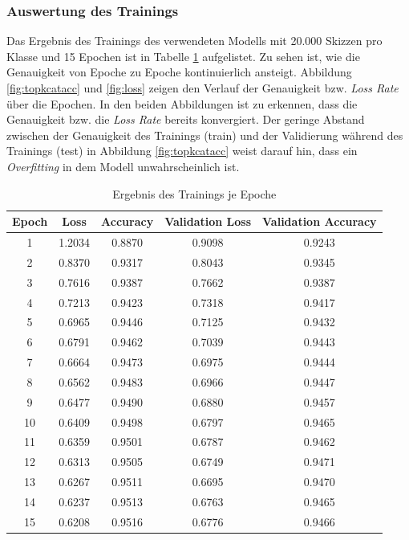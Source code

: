 \documentclass[11pt]{article}
\begin{document}
\subsubsection{Auswertung des Trainings}
Das Ergebnis des Trainings des verwendeten Modells mit 20.000 Skizzen pro Klasse und 15 Epochen ist in Tabelle \ref{tab:ErgebnisTraining} aufgelistet. Zu sehen ist, wie die Genauigkeit von Epoche zu Epoche kontinuierlich ansteigt.
Abbildung \ref{fig:topkcatacc} und \ref{fig:loss} zeigen den Verlauf der Genauigkeit bzw. \textit{Loss Rate} über die Epochen. In den beiden Abbildungen ist zu erkennen, dass die Genauigkeit bzw. die \textit{Loss Rate} bereits konvergiert. Der geringe Abstand zwischen der Genauigkeit des Trainings (train) und der Validierung während des Trainings (test) in Abbildung \ref{fig:topkcatacc} weist darauf hin, dass ein \textit{Overfitting} in dem Modell unwahrscheinlich ist. 


\begin{table}
	\centering
	\caption{\label{tab:ErgebnisTraining} Ergebnis des Trainings je Epoche}	
	\begin{tabular}{ccccc}
		\hline
		Epoch & Loss & Accuracy & Validation Loss & Validation Accuracy \\ 
		\hline
		1 & 1.2034  & 0.8870 & 0.9098 & 0.9243 \\
		2 & 0.8370  & 0.9317 & 0.8043 & 0.9345 \\
		3 & 0.7616  & 0.9387 & 0.7662 & 0.9387 \\
		4 & 0.7213  & 0.9423 & 0.7318 & 0.9417 \\
		5 & 0.6965  & 0.9446 & 0.7125 & 0.9432 \\
		6 & 0.6791  & 0.9462 & 0.7039 & 0.9443 \\
		7 & 0.6664  & 0.9473 & 0.6975 & 0.9444 \\
		8 & 0.6562  & 0.9483 & 0.6966 & 0.9447 \\
		9 & 0.6477  & 0.9490 & 0.6880 & 0.9457 \\
		10 & 0.6409  & 0.9498 & 0.6797 & 0.9465 \\
		11 & 0.6359  & 0.9501 & 0.6787 & 0.9462 \\
		12 & 0.6313  & 0.9505 & 0.6749 & 0.9471 \\
		13 & 0.6267  & 0.9511 & 0.6695 & 0.9470 \\
		14 & 0.6237  & 0.9513 & 0.6763 & 0.9465 \\
		15 & 0.6208  & 0.9516 & 0.6776 & 0.9466 \\ 
		\hline
	\end{tabular}
\end{table}
\end{document}
